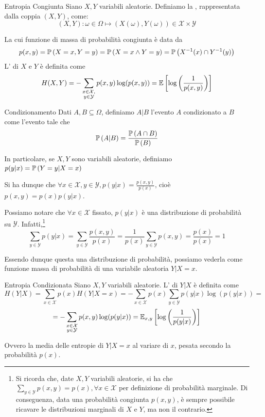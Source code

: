 \begin{definition}{Entropia Congiunta}
  Siano \(X, Y\) variabili aleatorie. Definiamo la , rappresentata dalla coppia \((X,Y)\), come:
  \[(X,Y): \omega \in \Omega \mapsto (X(\omega), Y(\omega)) \in \mathcal{X} \times \mathcal{Y}\]
  
  La cui funzione di massa di probabilità congiunta è data da
  \[p(x,y) = \Prob[X=x, Y=y] = \Prob[X=x \land Y=y] = \Prob[X^{-1}(x) \cap Y^{-1}(y)]\]
  L' di \(X\) e \(Y\) è definita come
  \[H(X,Y) = - \sum_{\substack{x \in \mathcal{X},\\ y \in \mathcal{Y}}} p(x,y) \log(p(x,y)) = \EV{\log\left(\frac{1}{p(x,y)}\right)}\]
\end{definition}

\begin{definition}{Condizionamento}
  Dati \(A,B \subseteq \Omega\), definiamo \(A|B\) l'evento \(A\) condizionato a \(B\) come l'evento tale che
  \[\Prob[A|B] = \frac{\Prob[A \cap B]}{\Prob[B]}\]

  In particolare, se \(X,Y\) sono variabili aleatorie, definiamo \(p(y|x) = \Prob[Y=y|X=x]\)

  Si ha dunque che \(\forall x \in \mathcal{X}, y \in \mathcal{Y}, p(y|x) = \frac{p(x,y)}{p(x)}\), cioè \(p(x,y) = p(x)p(y|x)\).
\end{definition}

Possiamo notare che  \(\forall x \in \mathcal{X}\) fissato, \(p(y|x)\) è una distribuzione di probabilità su \(\mathcal{Y}\).
Infatti,\footnote{Si ricorda che, date \(X,Y\) variabili aleatorie, si ha che \(\sum_{y \in \mathcal{Y}} p(x,y) = p(x), \forall x \in \mathcal{X}\) per definizione di probabilità marginale.
Di conseguenza, data una probabilità congiunta \(p(x,y)\), è sempre possibile ricavare le distribuzioni marginali di \(X\) e \(Y\), ma non il contrario.}
\[\sum_{y \in \mathcal{Y}} p(y|x) = \sum_{y \in \mathcal{Y}} \frac{p(x,y)}{p(x)} = \frac{1}{p(x)} \sum_{y \in \mathcal{Y}} p(x,y) = \frac{p(x)}{p(x)} = 1\]


Essendo dunque questa una distribuzione di probabilità, possiamo vederla come funzione massa di probabilità di una variabile aleatoria \(Y|X=x\).

\begin{definition}{Entropia Condizionata}
  Siano \(X,Y\) variabili aleatorie.
  L' di \(Y|X\) è definita come
  \[H(Y|X) = \sum_{x \in \mathcal{X}} p(x) H(Y|X=x) = - \sum_{x \in \mathcal{X}} p(x) \sum_{y \in \mathcal{Y}} p(y|x) \log(p(y|x)) = \]
  \[= -\sum_{\substack{x \in \mathcal{X}\\y \in \mathcal{Y}}} p(x,y) \log (p(y|x)) = \EV{\log\left(\frac{1}{p(y|x)}\right)}[x,y]\]
  
  Ovvero la media delle entropie di \(Y|X=x\) al variare di \(x\), pesata secondo la probabilità \(p(x)\).
\end{definition}

